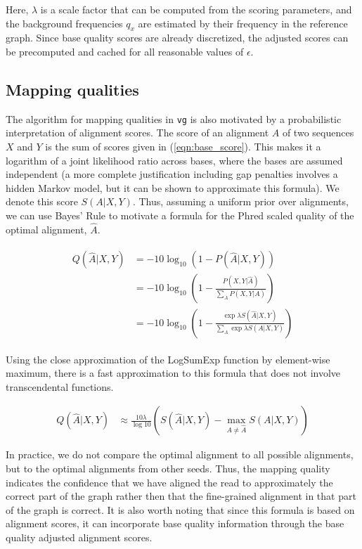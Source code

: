 Here, $\lambda$ is a scale factor that can be computed from the scoring parameters, and the background frequencies $q_x$ are estimated by their frequency in the reference graph. Since base quality scores are already discretized, the adjusted scores can be precomputed and cached for all reasonable values of $\epsilon$. 

\subsection{Mapping qualities}

The algorithm for mapping qualities in {\tt vg} is also motivated by a probabilistic interpretation of alignment scores. The score of an alignment $A$ of two sequences $X$ and $Y$ is the sum of scores given in (\ref{eqn:base_score}). This makes it a logarithm of a joint likelihood ratio across bases, where the bases are assumed independent (a more complete justification including gap penalties involves a hidden Markov model, but it can be shown to approximate this formula). We denote this score $S(A|X,Y)$. Thus, assuming a uniform prior over alignments, we can use Bayes' Rule to motivate a formula for the Phred scaled quality of the optimal alignment, $\hat A$.

\begin{align}
\begin{split}
    Q(\hat A|X,Y) &= -10\log_{10}(1 - P(\hat A|X,Y)) \\
    &= -10 \log_{10}\left(1 - \frac{P(X,Y|\hat A)}{\sum_{A}P(X,Y|A)} \right) \\
    &= -10 \log_{10}\left(1 - \frac{\exp \lambda S(\hat A|X,Y)}{\sum_{A}\exp \lambda S(A|X,Y)} \right) \label{basicqualityscore}
\end{split}
\end{align}

Using the close approximation of the LogSumExp function by element-wise maximum, there is a fast approximation to this formula that does not involve transcendental functions.

\begin{align}
    Q(\hat A|X,Y) &\approx \frac{10\lambda}{\log 10}\left( S(\hat A | X,Y) - \max_{A \neq \hat A}S(A| X,Y)\right)
\end{align}

In practice, we do not compare the optimal alignment to all possible alignments, but to the optimal alignments from other seeds. Thus, the mapping quality indicates the confidence that we have aligned the read to approximately the correct part of the graph rather then that the fine-grained alignment in that part of the graph is correct. It is also worth noting that since this formula is based on alignment scores, it can incorporate base quality information through the base quality adjusted alignment scores.


